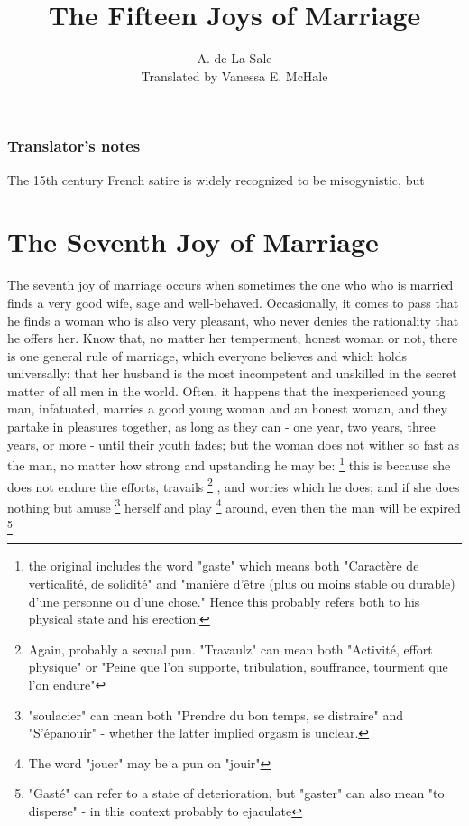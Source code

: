 \documentclass{book}
\begin{document}
\title{The Fifteen Joys of Marriage}
\author{A. de La Sale\\
Translated by Vanessa E. McHale}
\date{}
\maketitle
\tableofcontents

\subsection*{Translator's notes}
The 15th century French satire is widely recognized to be misogynistic, but 

\chapter{The Seventh Joy of Marriage}
The seventh joy of marriage occurs when sometimes the one who who is married finds a very good wife, sage and well-behaved. Occasionally, it comes to pass that he finds a woman who is also very pleasant, who never denies the rationality that he offers her. Know that, no matter her temperment, honest woman or not, there is one general rule of marriage, which everyone believes and which holds universally: that her husband is the most incompetent and unskilled in the secret matter of all men in the world. Often, it happens that the inexperienced young man, infatuated, marries a good young woman and an honest woman, and they partake in pleasures together, as long as they can - one year, two years, three years, or more - until their youth fades; but the woman does not wither so fast as the man, no matter how strong and upstanding he may be:
\footnote{the original includes the word "gaste" which means both "Caractère de verticalité, de solidité" and "manière d'être (plus ou moins stable ou durable) d'une personne ou d'une chose." Hence this probably refers both to his physical state and his erection.}
this is because she does not endure the efforts, travails
\footnote{Again, probably a sexual pun. "Travaulz" can mean both "Activité, effort physique" or "Peine que l'on supporte, tribulation, souffrance, tourment que l'on endure"} 
, and worries which he does; and if she does nothing but amuse
\footnote{"soulacier" can mean both "Prendre du bon temps, se distraire" and "S'épanouir" - whether the latter implied orgasm is unclear.}
herself and play
\footnote{The word "jouer" may be a pun on "jouir"}
around, even then the man will be expired
\footnote{"Gasté" can refer to a state of deterioration, but "gaster" can also mean "to disperse" - in this context probably to ejaculate}
\end{document}
